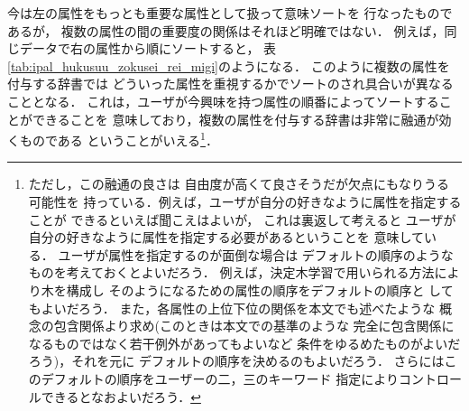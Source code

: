 今は左の属性をもっとも重要な属性として扱って意味ソートを
行なったものであるが，
複数の属性の間の重要度の関係はそれほど明確ではない．
例えば，同じデータで右の属性から順にソートすると，
表\ref{tab:ipal_hukusuu_zokusei_rei_migi}のようになる．
このように複数の属性を付与する辞書では
どういった属性を重視するかでソートのされ具合いが異なることとなる．
これは，ユーザが今興味を持つ属性の順番によってソートすることができることを
意味しており，複数の属性を付与する辞書は非常に融通が効くものである
ということがいえる\footnote{ただし，この融通の良さは
自由度が高くて良さそうだが欠点にもなりうる可能性を
持っている．例えば，ユーザが自分の好きなように属性を指定することが
できるといえば聞こえはよいが，
これは裏返して考えると
ユーザが自分の好きなように属性を指定する必要があるということを
意味している．
ユーザが属性を指定するのが面倒な場合は
デフォルトの順序のようなものを考えておくとよいだろう．
例えば，決定木学習で用いられる方法\cite{c4.5j}により木を構成し
そのようになるための属性の順序をデフォルトの順序と
してもよいだろう．
また，各属性の上位下位の関係を本文でも述べたような
概念の包含関係より求め(このときは本文での基準のような
完全に包含関係になるものではなく若干例外があってもよいなど
条件をゆるめたものがよいだろう)，それを元に
デフォルトの順序を決めるのもよいだろう．
さらにはこのデフォルトの順序をユーザーの二，三のキーワード
指定によりコントロールできるとなおよいだろう．}．

\begin{figure}[t]
  \begin{center}
  \end{center}
\end{figure}


\begin{figure}[t]
  \begin{center}
  \end{center}
\end{figure}

